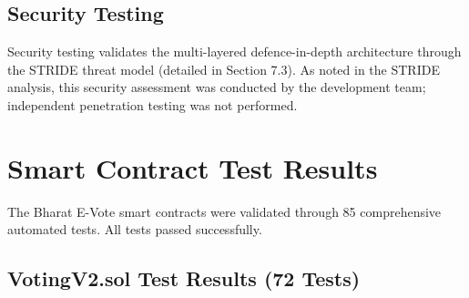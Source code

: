 \documentclass[oneside,a4paper,12pt]{book}
\begin{document}
\subsection{Security Testing}
Security testing validates the multi-layered defence-in-depth architecture through the STRIDE threat model (detailed in Section 7.3). As noted in the STRIDE analysis, this security assessment was conducted by the development team; independent penetration testing was not performed.

\section{Smart Contract Test Results}

The Bharat E-Vote smart contracts were validated through 85 comprehensive automated tests. All tests passed successfully.

\subsection{VotingV2.sol Test Results (72 Tests)}
\end{document}
